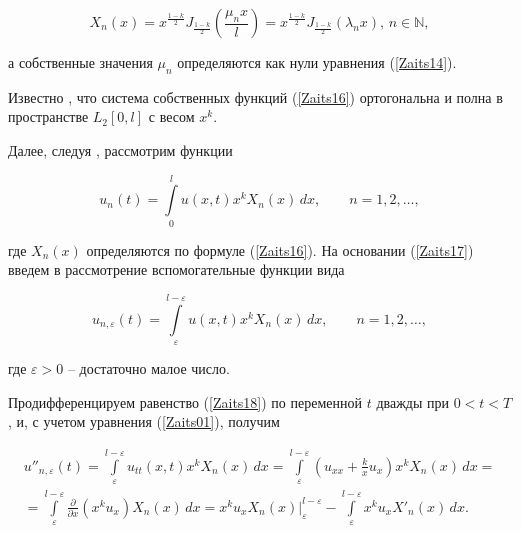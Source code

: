 \begin{equation}

\label{Zaits16}

X_n(x)=x^{\frac{1-k}{2}}J_{\frac{1-k}{2}}(\frac{\mu_n x}{l})=x^{\frac{1-k}{2}}J_{\frac{1-k}{2}}(\lambda_n x),\, n\in \mathbb{N},

\end{equation}

а собственные значения $\mu_n$ определяются как нули уравнения (\ref{Zaits14}).



Известно \cite[c.~308 -- 315]{Zaitseva:SKB3}, что система собственных функций (\ref{Zaits16}) ортогональна и полна в пространстве $L_2[0,l]$ с весом $x^k$.



Далее, следуя \cite{Zaitseva:SKBVag,Zaitseva:Saf}, рассмотрим функции

\begin{equation}

\label{Zaits17}

u_n(t)=\int\limits_0^l u(x,t)x^kX_n(x)\,dx,\qquad n=1,2,\ldots,

\end{equation}

где $X_n(x)$ определяются по формуле (\ref{Zaits16}). На основании (\ref{Zaits17}) введем в рассмотрение вспомогательные функции вида

\begin{equation}

\label{Zaits18}

u_{n,\varepsilon}(t)=\int\limits_\varepsilon^{l-\varepsilon} u(x,t)x^kX_n(x)\,dx,\qquad n=1,2,\ldots,

\end{equation}

где $\varepsilon>0$ -- достаточно малое число.

Продифференцируем равенство (\ref{Zaits18}) по переменной $t$ дважды при $0<t<T$, и, с учетом уравнения (\ref{Zaits01}), получим

\begin{multline}

\label{Zaits19}

u''_{n,\varepsilon}(t)=\int\limits_\varepsilon^{l-\varepsilon} u_{tt}(x,t)x^kX_n(x)\,dx=\int\limits_\varepsilon^{l-\varepsilon} \left(u_{xx}+\frac{k}{x}u_x\right)x^kX_n(x)\,dx=\\

=\int\limits_\varepsilon^{l-\varepsilon}\frac{\partial}{\partial x}(x^ku_x)X_n(x)\,dx=x^ku_xX_n(x)\Bigr|_\varepsilon^{l-\varepsilon}-\int\limits_\varepsilon^{l-\varepsilon} x^ku_xX'_n(x)\,dx.

\end{multline}




